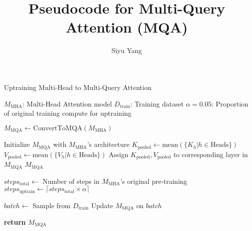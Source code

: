 \documentclass{article}
\title{Pseudocode for Multi-Query Attention (MQA)}
\author{Siyu Yang}
\date{}
\begin{document}
\maketitle

\begin{algorithm}
\caption{Uptraining Multi-Head to Multi-Query Attention}
\begin{algorithmic}[1]
\Require $M_{\text{MHA}}$: Multi-Head Attention model
\Require $D_{\text{train}}$: Training dataset
\Require $\alpha = 0.05$: Proportion of original training compute for uptraining

\State $M_{\text{MQA}} \gets \text{ConvertToMQA}(M_{\text{MHA}})$

    \State Initialize $M_{\text{MQA}}$ with $M_{\text{MHA}}$'s architecture
        \State $K_{\text{pooled}} \gets \text{mean}(\{K_{h} | h \in \text{Heads}\})$
        \State $V_{\text{pooled}} \gets \text{mean}(\{V_{h} | h \in \text{Heads}\})$
        \State Assign $K_{\text{pooled}}, V_{\text{pooled}}$ to corresponding layer in $M_{\text{MQA}}$
    \EndFor
    \State \Return $M_{\text{MQA}}$
\EndFunction

\State $steps_{\text{total}} \gets$ Number of steps in $M_{\text{MHA}}$'s original pre-training
\State $steps_{\text{uptrain}} \gets \lceil steps_{\text{total}} \times \alpha \rceil$

    \State $batch \gets$ Sample from $D_{\text{train}}$
    \State Update $M_{\text{MQA}}$ on $batch$ 
\EndFor

\State \textbf{return} $M_{\text{MQA}}$
\end{algorithmic}
\end{algorithm}
\end{document}
